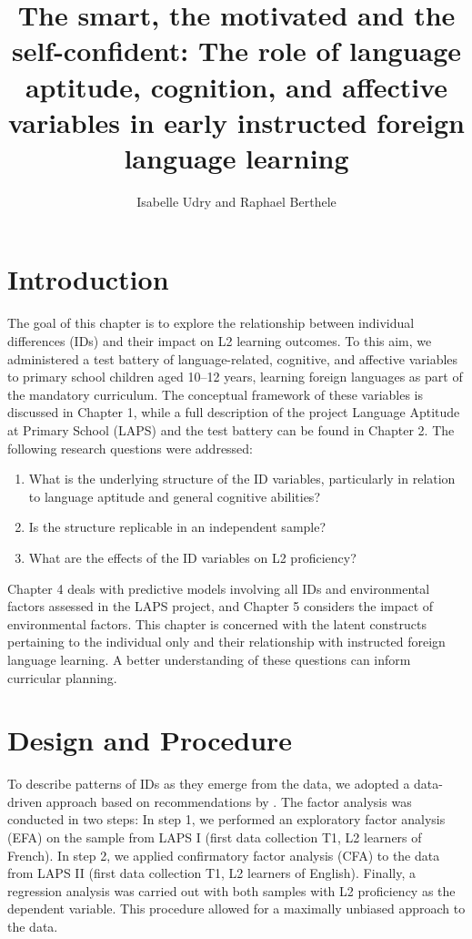 \documentclass[output=paper]{langsci/langscibook}
\author{Isabelle Udry\orcid{}\affiliation{University of Fribourg, Institut de Plurilinguisme; Zurich University of Teacher Education} and Raphael Berthele\orcid{}\affiliation{University of Fribourg, Institut de Plurilinguisme}}
\title[The smart, the motivated and the self-confident]
      {The smart, the motivated and the self-confident: The role of language aptitude, cognition, and affective variables in early instructed foreign language learning}
\begin{document}
\maketitle 

\section{Introduction}

The goal of this chapter is to explore the relationship between individual differences (IDs) and their impact on L2 learning outcomes. To this aim, we administered a test battery of language-related, cognitive, and affective variables to primary school children aged 10--12 years, learning foreign languages as part of the mandatory curriculum. The conceptual framework of these variables is discussed in Chapter 1, while a full description of the project Language Aptitude at Primary School (LAPS) and the test battery can be found in Chapter 2. The following research questions were addressed:

\begin{enumerate}
\item  What is the underlying structure of the ID variables, particularly in relation to language aptitude and general cognitive abilities?
\item  Is the structure replicable in an independent sample?
\item  What are the effects of the ID variables on L2 proficiency?
\end{enumerate}

Chapter 4 deals with predictive models involving all IDs and environmental factors assessed in the LAPS project, and Chapter 5 considers the impact of environmental factors. This chapter is concerned with the latent constructs pertaining to the individual only and their relationship with instructed foreign language learning. A better understanding of these questions can inform curricular planning. 

\section{Design and Procedure} %

To describe patterns of IDs as they emerge from the data, we adopted a data-driven approach based on recommendations by \citet{Brown2006}. The factor analysis was conducted in two steps: In step 1, we performed an exploratory factor analysis (EFA) on the sample from LAPS I (first data collection T1, L2 learners of French). In step 2, we applied confirmatory factor analysis (CFA) to the data from LAPS II (first data collection T1, L2 learners of English). Finally, a regression analysis was carried out with both samples with L2 proficiency as the dependent variable. This procedure allowed for a maximally unbiased approach to the data. 
\end{document}
